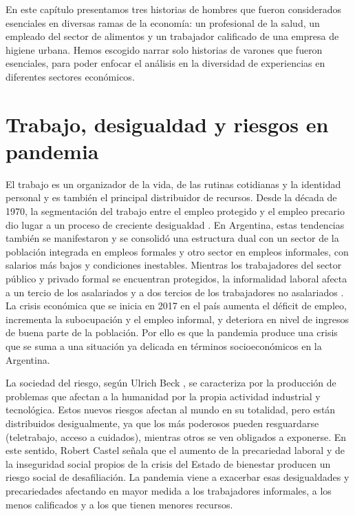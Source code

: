 \begin{refsection}
En este capítulo presentamos tres historias de hombres que fueron considerados esenciales en diversas ramas de la economía: un profesional de la salud, un empleado del sector de alimentos y un trabajador calificado de una empresa de higiene urbana. Hemos escogido narrar solo historias de varones que fueron esenciales, para poder enfocar el análisis en la diversidad de experiencias en diferentes sectores económicos.


\section[Trabajo, desigualdad y riesgos en pandemia]{Trabajo, desigualdad y riesgos en pandemia}
\label{cap-29.trabajo-desigualdad-y-riesgos-en-pandemia}
El trabajo es un organizador de la vida, de las rutinas cotidianas y la identidad personal y es también el principal distribuidor de recursos. Desde la década de 1970, la segmentación del trabajo entre el empleo protegido y el empleo precario dio lugar a un proceso de creciente desigualdad \protect\parencite{4218-CASTEL1995}. En Argentina, estas tendencias también se manifestaron y se consolidó una estructura dual con un sector de la población integrada en empleos formales y otro sector en empleos informales, con salarios más bajos y condiciones inestables. Mientras los trabajadores del sector público y privado formal se encuentran protegidos, la informalidad laboral afecta a un tercio de los asalariados y a dos tercios de los trabajadores no asalariados \protect\parencite{4220-SALVIA2018}. La crisis económica que se inicia en 2017 en el país aumenta el déficit de empleo, incrementa la subocupación y el empleo informal, y deteriora en nivel de ingresos de buena parte de la población. Por ello es que la pandemia produce una crisis que se suma a una situación ya delicada en términos socioeconómicos en la Argentina.

La sociedad del riesgo, según Ulrich Beck \protect\parencite*{4217-BECK1998}, se caracteriza por la producción de problemas que afectan a la humanidad por la propia actividad industrial y tecnológica. Estos nuevos riesgos afectan al mundo en su totalidad, pero están distribuidos desigualmente, ya que los más poderosos pueden resguardarse (teletrabajo, acceso a cuidados), mientras otros se ven obligados a exponerse. En este sentido, Robert Castel señala que el aumento de la precariedad laboral y de la inseguridad social propios de la crisis del Estado de bienestar producen un riesgo social de desafiliación. La pandemia viene a exacerbar esas desigualdades y precariedades afectando en mayor medida a los trabajadores informales, a los menos calificados y a los que tienen menores recursos.


\end{refsection}

